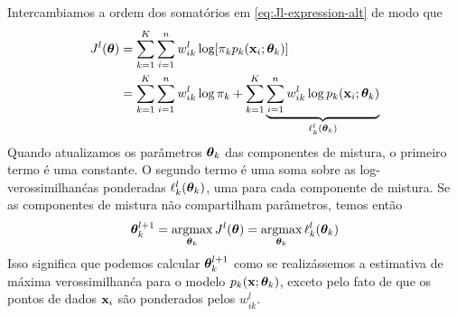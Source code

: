 \begin{exenumerate}
    \begin{solution}
        Intercambiamos a ordem dos somat\'orios em \eqref{eq:Jl-expression-alt} de modo
        que
        \begin{align}
            J^l(\boldsymbol{\theta}) & = \sum_{k=1}^K \sum_{i=1}^n  w_{ik}^l  \log[  \pi_k  p_k(\mathbf{x}_i; \boldsymbol{\theta}_k) ]\\
            & =  \sum_{k=1}^K \sum_{i=1}^n  w_{ik}^l \log \pi_k + \sum_{k=1}^K \underbrace{\sum_{i=1}^n  w_{ik}^l \log p_k(\mathbf{x}_i; \boldsymbol{\theta}_k)}_{\ell_k^l(\boldsymbol{\theta}_k)}
            \label{eq:Jl-interchanged-alt}
        \end{align}
        Quando atualizamos os par\^ametros $\boldsymbol{\theta}_k$ das componentes de mistura, o
        primeiro termo \'e uma constante. O segundo termo \'e uma soma sobre as
        log-verossimilhan\'cas ponderadas $\ell_k^l(\boldsymbol{\theta}_k)$, uma para cada componente de mistura. Se as
        componentes de mistura n\~ao compartilham par\^ametros, temos ent\~ao
        \begin{equation}
            \boldsymbol{\theta}_k^{l+1} =  \operatorname*{\mathrm{argmax}}_{\boldsymbol{\theta}_k}  J^l(\boldsymbol{\theta}) = \operatorname*{\mathrm{argmax}}_{\boldsymbol{\theta}_k} \ell_k^l(\boldsymbol{\theta}_k)
        \end{equation}
        Isso significa que podemos calcular $\boldsymbol{\theta}_k^{l+1}$ como se realiz\'assemos a estimativa de
        m\'axima verossimilhan\'ca para o modelo $p_k(\mathbf{x}; \boldsymbol{\theta}_k)$, exceto pelo fato de
        que os pontos de dados $\mathbf{x}_i$ s\~ao ponderados pelos $w_{ik}^l$.
    \end{solution}
    

\end{exenumerate}
